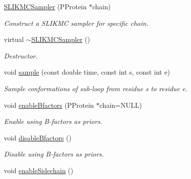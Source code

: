 \begin{DoxyCompactItemize}
\item 
\hypertarget{classSLIKMCSampler_af3e1290fab6f427f262aa8eecc07d3b0}{\hyperlink{classSLIKMCSampler_af3e1290fab6f427f262aa8eecc07d3b0}{S\-L\-I\-K\-M\-C\-Sampler} (P\-Protein $\ast$chain)}\label{classSLIKMCSampler_af3e1290fab6f427f262aa8eecc07d3b0}

\begin{DoxyCompactList}\small\item\em Construct a S\-L\-I\-K\-M\-C sampler for specific chain. \end{DoxyCompactList}\item 
\hypertarget{classSLIKMCSampler_a371e96a0e8c02751ac24d00f734ed451}{virtual \hyperlink{classSLIKMCSampler_a371e96a0e8c02751ac24d00f734ed451}{$\sim$\-S\-L\-I\-K\-M\-C\-Sampler} ()}\label{classSLIKMCSampler_a371e96a0e8c02751ac24d00f734ed451}

\begin{DoxyCompactList}\small\item\em Destructor. \end{DoxyCompactList}\item 
void \hyperlink{classSLIKMCSampler_a38e16552bc3531e1385aad7c13aebb63}{sample} (const double time, const int s, const int e)
\begin{DoxyCompactList}\small\item\em Sample conformations of sub-\/loop from residue s to residue e. \end{DoxyCompactList}\item 
void \hyperlink{classSLIKMCSampler_ac093b0714e10dcfe317ba827f0fe13f8}{enable\-Bfactors} (P\-Protein $\ast$chain=N\-U\-L\-L)
\begin{DoxyCompactList}\small\item\em Enable using B-\/factors as priors. \end{DoxyCompactList}\item 
\hypertarget{classSLIKMCSampler_a9d9db8cd58a9e7f56069fd37c8b92841}{void \hyperlink{classSLIKMCSampler_a9d9db8cd58a9e7f56069fd37c8b92841}{disable\-Bfactors} ()}\label{classSLIKMCSampler_a9d9db8cd58a9e7f56069fd37c8b92841}

\begin{DoxyCompactList}\small\item\em Disable using B-\/factors as priors. \end{DoxyCompactList}\item 
\hypertarget{classSLIKMCSampler_a1bd6fa06f57694595e881e3898d5550b}{void \hyperlink{classSLIKMCSampler_a1bd6fa06f57694595e881e3898d5550b}{enable\-Sidechain} ()}\label{classSLIKMCSampler_a1bd6fa06f57694595e881e3898d5550b}


\end{DoxyCompactItemize}
